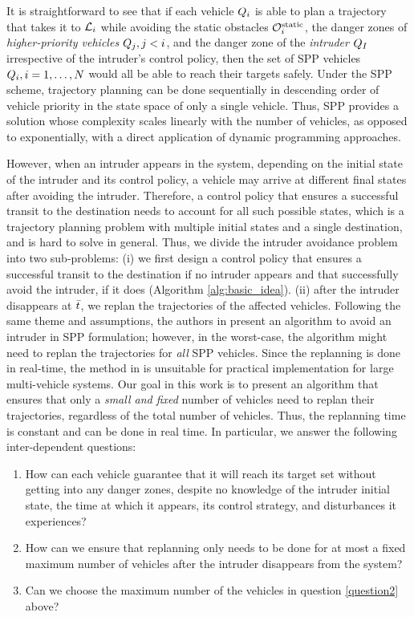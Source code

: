 It is straightforward to see that if each vehicle $Q_i$ is able to plan a trajectory that takes it to $\mathcal{L}_i$ while avoiding the static obstacles $\mathcal{O}^\text{static}_i$, the danger zones of \textit{higher-priority vehicles} $Q_j, j<i$, and the danger zone of the \textit{intruder} $Q_{I}$ irrespective of the intruder's control policy, then the set of SPP vehicles $Q_i, i=1,\ldots,N$ would all be able to reach their targets safely. Under the SPP scheme, trajectory planning can be done sequentially in descending order of vehicle priority in the state space of only a single vehicle. Thus, SPP provides a solution whose complexity scales linearly with the number of vehicles, as opposed to exponentially, with a direct application of dynamic programming approaches. 

 However, when an intruder appears in the system, depending on the initial state of the intruder and its control policy, a vehicle may arrive at different final states after avoiding the intruder. Therefore, a control policy that ensures a successful transit to the destination needs to account for all such possible states, which is a trajectory planning problem with multiple initial states and a single destination, and is hard to solve in general. Thus, we divide the intruder avoidance problem into two sub-problems: (i) we first design a control policy that ensures a successful transit to the destination if no intruder appears and that successfully avoid the intruder, if it does (Algorithm \ref{alg:basic_idea}). (ii) after the intruder disappears at $\bar{t}$, we replan the trajectories of the affected vehicles. Following the same theme and assumptions, the authors in \cite{chen2016robust} present an algorithm to avoid an intruder in SPP formulation; however, in the worst-case, the algorithm might need to replan the trajectories for \textit{all} SPP vehicles. Since the replanning is done in real-time, the method in \cite{chen2016robust} is unsuitable for practical implementation for large multi-vehicle systems. Our goal in this work is to present an algorithm that ensures that only a \textit{small and fixed} number of vehicles need to replan their trajectories, regardless of the total number of vehicles. Thus, the replanning time is constant and can be done in real time. In particular, we answer the following inter-dependent questions:
\begin{enumerate}
\item How can each vehicle guarantee that it will reach its target set without getting into any danger zones, despite no knowledge of the intruder initial state, the time at which it appears, its control strategy, and disturbances it experiences?
\item How can we ensure that replanning only needs to be done for at most a fixed maximum number of vehicles after the intruder disappears from the system? \label{question2}
\item Can we choose the maximum number of the vehicles in question \ref{question2} above?
\end{enumerate}

